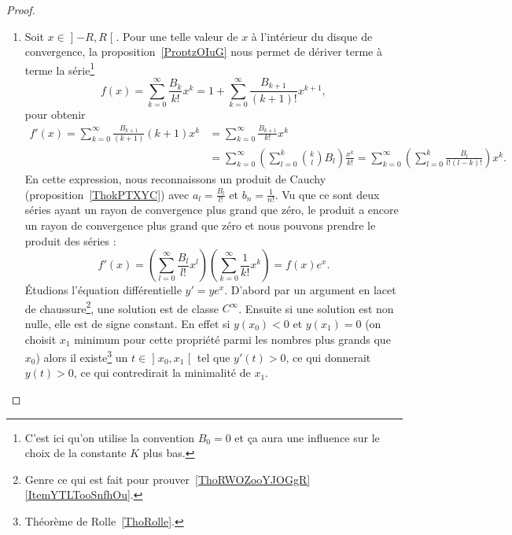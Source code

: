 \begin{proof}
\begin{enumerate}
		\item

		      Soit \( x\in\mathopen] -R , R \mathclose[\). Pour une telle valeur de \( x\) à l'intérieur du disque de convergence, la proposition~\ref{ProptzOIuG} nous permet de dériver terme à terme la série\footnote{C'est ici qu'on utilise la convention \( B_0=0\) et ça aura une influence sur le choix de la constante \( K\) plus bas.}
			      \begin{equation}
				      f(x)=\sum_{k=0}^{\infty}\frac{ B_k }{ k! }x^k=1+\sum_{k=0}^{\infty}\frac{ B_{k+1} }{ (k+1)! }x^{k+1},
			      \end{equation}
			      pour obtenir
			      \begin{subequations}
				      \begin{align}
					      f'(x)=\sum_{k=0}^{\infty}\frac{ B_{k+1} }{ (k+1) }(k+1)x^k & =\sum_{k=0}^{\infty}\frac{ B_{k+1} }{ k! }x^k                                                                                                               \\
					                                                                 & =\sum_{k=0}^{\infty}\left( \sum_{l=0}^k{k\choose l}B_l \right)\frac{ x^k }{ k! }=\sum_{k=0}^{\infty}\left( \sum_{l=0}^k\frac{ B_l }{ l!(l-k)! } \right)x^k.
				      \end{align}
			      \end{subequations}
			      En cette expression, nous reconnaissons un produit de Cauchy (proposition~\ref{ThokPTXYC}) avec \( a_l=\frac{ B_l }{ l! }\) et \( b_n=\frac{ 1 }{ n! }\). Vu que ce sont deux séries ayant un rayon de convergence plus grand que zéro, le produit a encore un rayon de convergence plus grand que zéro et nous pouvons prendre le produit des séries :
			      \begin{equation}
				      f'(x)=\left( \sum_{l=0}^{\infty}\frac{ B_l }{ l! }x^l \right)\left( \sum_{k=0}^{\infty}\frac{1}{ k! }x^k \right)=f(x) e^{x}.
			      \end{equation}
			      Étudions l'équation différentielle \( y'=ye^x\). D'abord par un argument en lacet de chaussure\footnote{Genre ce qui est fait pour prouver~\ref{ThoRWOZooYJOGgR}\ref{ItemYTLTooSnfhOu}.}, une solution est de classe \(  C^{\infty}\). Ensuite si une solution est non nulle, elle est de signe constant. En effet si \( y(x_0)<0\) et \( y(x_1)=0\) (on choisit \( x_1\) minimum pour cette propriété parmi les nombres plus grands que \( x_0\)) alors il existe\footnote{Théorème de Rolle~\ref{ThoRolle}.} un \( t\in\mathopen] x_0 , x_1 \mathclose[\) tel que \( y'(t)>0\), ce qui donnerait \( y(t)>0\), ce qui contredirait la minimalité de \( x_1\).


\end{enumerate}
\end{proof}
